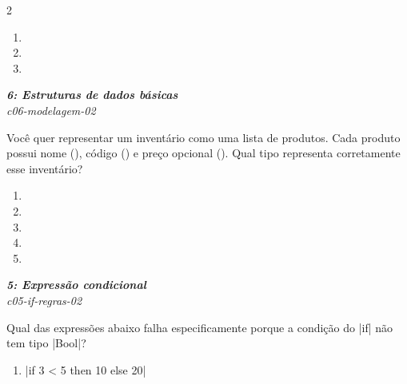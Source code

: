 \documentclass[a4paper,10pt,brazil]{article}
\begin{document}
\begin{multicols}{2}
\begin{enumerate}
  \item {}

  \item {}

  \item {}


\end{enumerate}

\begin{flushright}
  \footnotesize
  \textit{\textbf{6: Estruturas de dados básicas}}\\
  \textit{c06-modelagem-02}\\

\end{flushright}
Você quer representar um inventário como uma lista de produtos. Cada produto possui nome (), código () e preço opcional (). Qual tipo representa corretamente esse inventário?

\begin{enumerate}
  \item {}

  \item {}

  \item {}

  \item {}

  \item {}


\end{enumerate}

\begin{flushright}
  \footnotesize
  \textit{\textbf{5: Expressão condicional}}\\
  \textit{c05-if-regras-02}\\

\end{flushright}
Qual das expressões abaixo falha especificamente porque a condição do \haskellinline|if| não tem tipo \haskellinline|Bool|?

\begin{enumerate}
  \item \haskellinline|if 3 < 5 then 10 else 20|


\end{enumerate}
\end{multicols}
\end{document}
